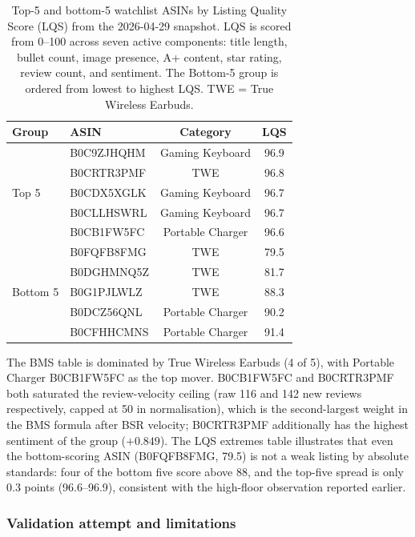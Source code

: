 \begin{table}[H]
  \centering
  \small
  \begin{tabular}{llcc}
    \toprule
    \textbf{Group} & \textbf{ASIN} & \textbf{Category} & \textbf{LQS} \\
    \midrule
    \multirow{5}{*}{Top 5}
      & B0C9ZJHQHM & Gaming Keyboard  & 96.9 \\
      & B0CRTR3PMF & TWE              & 96.8 \\
      & B0CDX5XGLK & Gaming Keyboard  & 96.7 \\
      & B0CLLHSWRL & Gaming Keyboard  & 96.7 \\
      & B0CB1FW5FC & Portable Charger & 96.6 \\
    \midrule
    \multirow{5}{*}{Bottom 5}
      & B0FQFB8FMG & TWE              & 79.5 \\
      & B0DGHMNQ5Z & TWE              & 81.7 \\
      & B0G1PJLWLZ & TWE              & 88.3 \\
      & B0DCZ56QNL & Portable Charger & 90.2 \\
      & B0CFHHCMNS & Portable Charger & 91.4 \\
    \bottomrule
  \end{tabular}
  \caption{Top-5 and bottom-5 watchlist ASINs by Listing Quality Score (LQS) from the 2026-04-29 snapshot. LQS is scored from 0--100 across seven active components: title length, bullet count, image presence, A+ content, star rating, review count, and sentiment. The Bottom-5 group is ordered from lowest to highest LQS. TWE = True Wireless Earbuds.}
  \label{tab:lqs_extremes}
\end{table}

The BMS table is dominated by True Wireless Earbuds (4 of 5), with Portable Charger B0CB1FW5FC as the top mover. B0CB1FW5FC and B0CRTR3PMF both saturated the review-velocity ceiling (raw 116 and 142 new reviews respectively, capped at 50 in normalisation), which is the second-largest weight in the BMS formula after BSR velocity; B0CRTR3PMF additionally has the highest sentiment of the group ($+0.849$). The LQS extremes table illustrates that even the bottom-scoring ASIN (B0FQFB8FMG, 79.5) is not a weak listing by absolute standards: four of the bottom five score above 88, and the top-five spread is only 0.3 points (96.6--96.9), consistent with the high-floor observation reported earlier.

\subsubsection*{Validation attempt and limitations}

